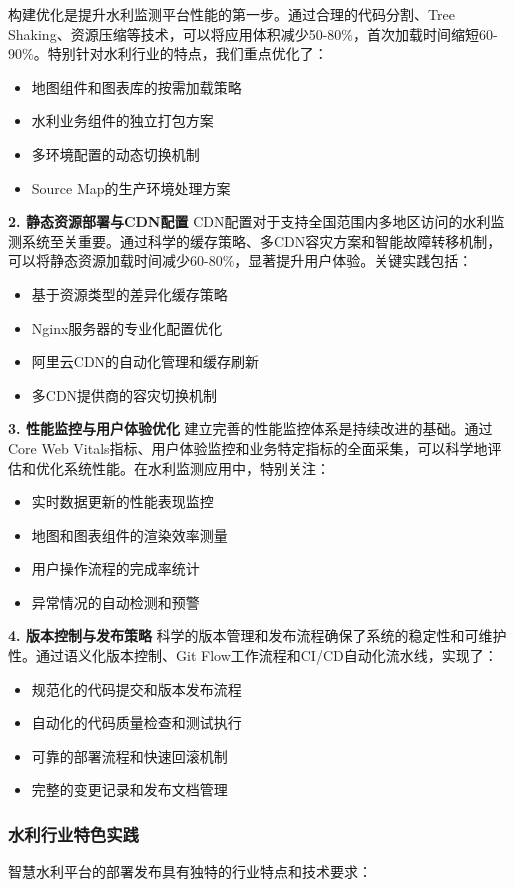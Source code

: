 构建优化是提升水利监测平台性能的第一步。通过合理的代码分割、Tree Shaking、资源压缩等技术，可以将应用体积减少50-80\%，首次加载时间缩短60-90\%。特别针对水利行业的特点，我们重点优化了： \begin{itemize} \item 地图组件和图表库的按需加载策略 \item 水利业务组件的独立打包方案 \item 多环境配置的动态切换机制 \item Source Map的生产环境处理方案 \end{itemize} \textbf{2. 静态资源部署与CDN配置} CDN配置对于支持全国范围内多地区访问的水利监测系统至关重要。通过科学的缓存策略、多CDN容灾方案和智能故障转移机制，可以将静态资源加载时间减少60-80\%，显著提升用户体验。关键实践包括： \begin{itemize} \item 基于资源类型的差异化缓存策略 \item Nginx服务器的专业化配置优化 \item 阿里云CDN的自动化管理和缓存刷新 \item 多CDN提供商的容灾切换机制 \end{itemize} \textbf{3. 性能监控与用户体验优化} 建立完善的性能监控体系是持续改进的基础。通过Core Web Vitals指标、用户体验监控和业务特定指标的全面采集，可以科学地评估和优化系统性能。在水利监测应用中，特别关注： \begin{itemize} \item 实时数据更新的性能表现监控 \item 地图和图表组件的渲染效率测量 \item 用户操作流程的完成率统计 \item 异常情况的自动检测和预警 \end{itemize} \textbf{4. 版本控制与发布策略} 科学的版本管理和发布流程确保了系统的稳定性和可维护性。通过语义化版本控制、Git Flow工作流程和CI/CD自动化流水线，实现了： \begin{itemize} \item 规范化的代码提交和版本发布流程 \item 自动化的代码质量检查和测试执行 \item 可靠的部署流程和快速回滚机制 \item 完整的变更记录和发布文档管理 \end{itemize} \subsubsection{水利行业特色实践}\label{ux6c34ux5229ux884cux4e1aux7279ux8272ux5b9eux8df5} 智慧水利平台的部署发布具有独特的行业特点和技术要求： 